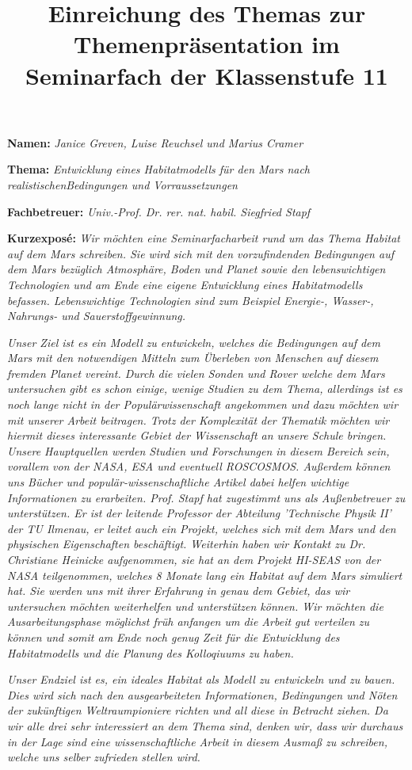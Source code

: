\documentclass[11pt]{article}
\title{\textbf{Einreichung des Themas zur Themenpräsentation im Seminarfach der Klassenstufe 11}}
\begin{document}
\maketitle

\medskip

\textbf{Namen:} \textit{Janice Greven, Luise Reuchsel und Marius Cramer}

\bigskip

\textbf{Thema:} \textit{Entwicklung eines Habitatmodells für den Mars nach realistischen\newline Bedingungen und Vorraussetzungen}

\bigskip

\textbf{Fachbetreuer:} \textit{Univ.-Prof. Dr. rer. nat. habil.
Siegfried Stapf}

\bigskip

\textbf{Kurzexposé:} \textit{Wir möchten eine Seminarfacharbeit rund um das Thema Habitat auf dem Mars schreiben. Sie wird sich mit den vorzufindenden Bedingungen auf dem Mars bezüglich Atmosphäre, Boden und Planet sowie den lebenswichtigen Technologien und am Ende eine eigene Entwicklung eines Habitatmodells befassen. Lebenswichtige Technologien sind zum Beispiel Energie-, Wasser-, Nahrungs- und Sauerstoffgewinnung.} \par
\textit{Unser Ziel ist es ein Modell zu entwickeln, welches die Bedingungen auf dem Mars mit den notwendigen Mitteln zum Überleben von Menschen auf diesem fremden Planet vereint. Durch die vielen Sonden und Rover welche dem Mars untersuchen gibt es schon einige, wenige Studien zu dem Thema, allerdings ist es noch lange nicht in der Populärwissenschaft angekommen und dazu möchten wir mit unserer Arbeit beitragen. Trotz der Komplexität der Thematik möchten wir hiermit dieses interessante Gebiet der Wissenschaft an unsere Schule bringen. Unsere Hauptquellen werden Studien und Forschungen in diesem Bereich sein, vorallem von der NASA, ESA und eventuell ROSCOSMOS. Außerdem können uns Bücher und populär-wissenschaftliche Artikel dabei helfen wichtige Informationen zu erarbeiten. Prof. Stapf hat zugestimmt uns als Außenbetreuer zu unterstützen. Er ist der leitende Professor der Abteilung 'Technische Physik II' der TU Ilmenau, er leitet auch ein Projekt, welches sich mit dem Mars und den physischen Eigenschaften beschäftigt. Weiterhin haben wir Kontakt zu Dr. Christiane Heinicke aufgenommen, sie hat an dem Projekt HI-SEAS von der NASA teilgenommen, welches 8 Monate lang ein Habitat auf dem Mars simuliert hat. Sie werden uns mit ihrer Erfahrung in genau dem Gebiet, das wir untersuchen möchten weiterhelfen und unterstützen können. Wir möchten die Ausarbeitungsphase möglichst früh anfangen um die Arbeit gut verteilen zu können und somit am Ende noch genug Zeit für die Entwicklung des Habitatmodells und die Planung des Kolloqiuums zu haben.} \par
\textit{Unser Endziel ist es, ein ideales Habitat als Modell zu entwickeln und zu bauen. Dies wird sich nach den ausgearbeiteten Informationen, Bedingungen und Nöten der zukünftigen Weltraumpioniere richten und all diese in Betracht ziehen. Da wir alle drei sehr interessiert an dem Thema sind, denken wir, dass wir durchaus in der Lage sind eine wissenschaftliche Arbeit in diesem Ausmaß zu schreiben, welche uns selber zufrieden stellen wird.}
\end{document}
